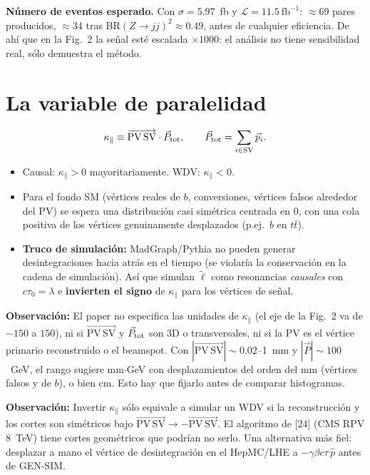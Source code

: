\documentclass[11pt,a4paper]{article}
\newcommand{\lt}{\tilde{\ell}}
\newcommand{\kpar}{\kappa_{\parallel}}
\newcommand{\PVSV}{\overrightarrow{\mathrm{PV\,SV}}}
\newcommand{\obs}[1]{\par\smallskip\noindent\colorbox{orange!12}{\parbox{\dimexpr\linewidth-2\fboxsep}{\small\textbf{Observación:} #1}}\par\smallskip}
\begin{document}
\textbf{Número de eventos esperado.} Con $\sigma=5.97$~fb y $\mathcal{L}=11.5~\mathrm{fb}^{-1}$: $\approx 69$ pares producidos, $\approx 34$ tras BR$(Z\to jj)^2\approx0.49$, antes de cualquier eficiencia. De ahí que en la Fig.~2 la señal esté escalada $\times1000$: el análisis no tiene sensibilidad real, sólo demuestra el método.

\section{La variable de paralelidad}
\begin{equation}
\kpar\equiv\PVSV\cdot\vec P_{\rm tot},\qquad \vec P_{\rm tot}=\sum_{i\in\mathrm{SV}}\vec p_i .
\end{equation}
\begin{itemize}
\item Causal: $\kpar>0$ mayoritariamente. WDV: $\kpar<0$.
\item Para el fondo SM (vértices reales de $b$, conversiones, vértices falsos alrededor del PV) se espera una distribución casi simétrica centrada en 0, con una cola positiva de los vértices genuinamente desplazados (p.ej.\ $b$ en $t\bar t$).
\item \textbf{Truco de simulación:} MadGraph/Pythia no pueden generar desintegraciones hacia atrás en el tiempo (se violaría la conservación en la cadena de simulación). Así que simulan $\lt$ como resonancias \emph{causales} con $c\tau_0=\lambda$ e \textbf{invierten el signo} de $\kpar$ para los vértices de señal.
\end{itemize}

\obs{El paper no especifica las unidades de $\kpar$ (el eje de la Fig.~2 va de $-150$ a $150$), ni si $\PVSV$ y $\vec P_{\rm tot}$ son 3D o transversales, ni si la PV es el vértice primario reconstruido o el beamspot. Con $|\PVSV|\sim 0.02$--1~mm y $|\vec P|\sim 100$~GeV, el rango sugiere mm$\cdot$GeV con desplazamientos del orden del mm (vértices falsos y de $b$), o bien cm. Esto hay que fijarlo antes de comparar histogramas.}

\obs{Invertir $\kpar$ sólo equivale a simular un WDV si la reconstrucción y los cortes son simétricos bajo $\PVSV\to-\PVSV$. El algoritmo de [24] (CMS RPV 8~TeV) tiene cortes geométricos que podrían no serlo. Una alternativa más fiel: desplazar a mano el vértice de desintegración en el HepMC/LHE a $-\gamma\beta c\tau\,\hat p$ antes de GEN-SIM.}
\end{document}
